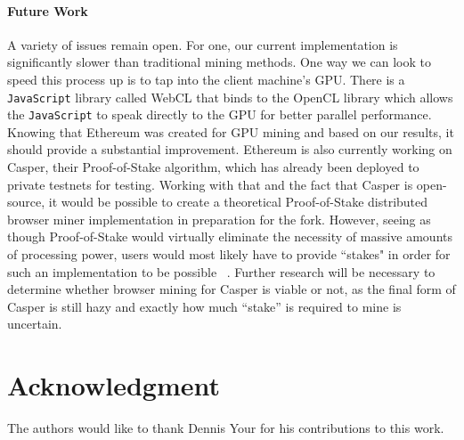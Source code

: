 \documentclass[runningheads]{llncs}
\begin{document}

\paragraph{\textbf{Future Work}}
A variety of issues remain open.  For one, our current implementation is significantly slower than traditional mining methods. One way we can look to speed this process up is to tap into the client machine's GPU. There is a \verb|JavaScript| library called WebCL that binds to the OpenCL library which allows the \verb|JavaScript| to speak directly to the GPU for better parallel performance. Knowing that Ethereum was created for GPU mining and based on our results, it should provide a substantial improvement. 
Ethereum is also currently working on Casper, their Proof-of-Stake algorithm, which has already been deployed to private testnets for testing. Working with that and the fact that Casper is open-source, it would be possible to create a theoretical Proof-of-Stake distributed browser miner implementation in preparation for the fork. However, seeing as though Proof-of-Stake would virtually eliminate the necessity of massive amounts of processing power, users would most likely have to provide ``stakes" in order for such an implementation to be possible ~\cite{PoSproof}. Further research will be necessary to determine whether browser mining for Casper is viable or not, as the final form of Casper is still hazy and exactly how much ``stake'' is required to mine is uncertain.




\section*{Acknowledgment}
The authors would like to thank Dennis Your for his contributions to this work.
\end{document}
